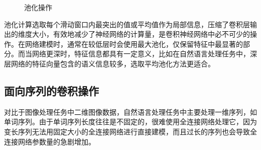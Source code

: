 \begin{figure}[htp]
\centering
%
\caption{池化操作}
\label{fig:11-8}
\end{figure}

\parinterval 池化计算选取每个滑动窗口内最突出的值或平均值作为局部信息，压缩了卷积层输出的维度大小，有效地减少了神经网络的计算量，是卷积神经网络中必不可少的操作。在网络建模时，通常在较低层时会使用最大池化，仅保留特征中最显著的部分。而当网络更深时，特征信息都具有一定意义，比如在自然语言处理任务中，深层网络的特征向量包含的语义信息较多，选取平均池化方法更适合。



\subsection{面向序列的卷积操作}

\parinterval 对比于图像处理任务中二维图像数据，自然语言处理任务中主要处理一维序列，如单词序列。由于单词序列长度往往是不固定的，很难使用全连接网络处理它，因为变长序列无法用固定大小的全连接网络进行直接建模，而且过长的序列也会导致全连接网络参数量的急剧增加。

